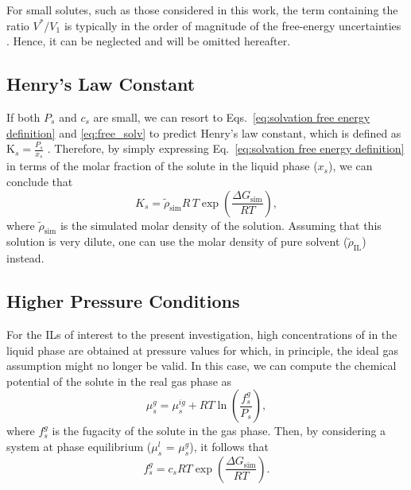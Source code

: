 \documentclass[3p,twocolumn]{elsarticle}
\begin{document}
For small solutes, such as those considered in this work, the term containing the ratio $V^{\ast}/V_1$ is typically in the order of magnitude of the free-energy uncertainties \cite{Shirts_2003}.
Hence, it can be neglected and will be omitted hereafter.

\subsection*{Henry's Law Constant}

If both $P_s$ and $c_s$ are small, we can resort to Eqs.~\eqref{eq:solvation free energy definition} and \eqref{eq:free_solv} to predict Henry's law constant, which is defined as $\text{K}_s =\frac{P_s}{x_s}$ \cite{Prausnitz}.
%
Therefore, by simply expressing Eq.~\eqref{eq:solvation free energy definition} in terms of the molar fraction of the solute in the liquid phase ($x_s$), we can conclude that
\begin{equation}
\label{eq:henry_eq}
K_s = \tilde{\rho}_\text{sim} R \, T \exp\left(\frac{\Delta G_\text{sim}}{R T}\right),
\end{equation}
where $\tilde{\rho}_\text{sim}$ is the simulated molar density of the solution. Assuming that this solution is very dilute, one can use the molar density of pure solvent ($\tilde{\rho}_\text{IL}$) instead.

\subsection*{Higher Pressure Conditions}
\label{sec:partial_pressure}

For the ILs of interest to the present investigation, high concentrations of  in the liquid phase are obtained at pressure values for which, in principle, the ideal gas assumption might no longer be valid.
In this case, we can compute the chemical potential of the solute in the real gas phase as
\begin{equation}
\label{eq:mu_gas_real}
\mu^{g}_s = \mu^{ig}_s + R T \ln \left(\frac{f^{g}_s}{P_s}\right),
\end{equation}
where $f^{g}_s$ is the fugacity of the solute in the gas phase.
Then, by considering a system at phase equilibrium ($\mu^{l}_s$ = $\mu^{g}_s$), it follows that
\begin{equation}
\label{eq:fgas_d}
f^{g}_s = c_s R T \exp \left( \frac{\Delta G_\text{sim}}{R T} \right). 
\end{equation}
\end{document}
